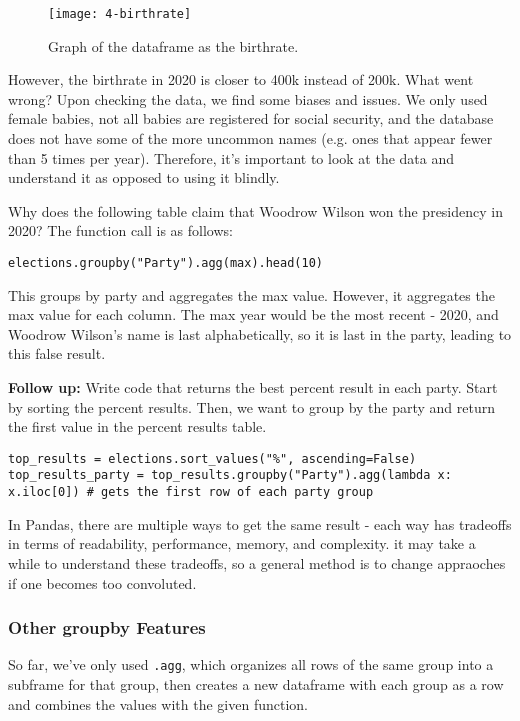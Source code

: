 \begin{figure}[ht]
\texttt{[image: 4-birthrate]}\centering\caption{Graph of the dataframe as the birthrate.}
\end{figure}
However, the birthrate in 2020 is closer to 400k instead of 200k. What went wrong? Upon checking the data, we find some biases and issues. We only used female babies, not all babies are registered for social security, and the database does not have some of the more uncommon names (e.g. ones that appear fewer than 5 times per year). Therefore, it's important to look at the data and understand it as opposed to using it blindly.

\begin{example}[]{Why does the following table claim that Woodrow Wilson won the presidency in 2020? The function call is as follows:
\begin{verbatim}
elections.groupby("Party").agg(max).head(10)
\end{verbatim}
}
\tcbline
This groups by party and aggregates the max value. However, it aggregates the max value for each column. The max year would be the most recent - 2020, and Woodrow Wilson's name is last alphabetically, so it is last in the party, leading to this false result.

\textbf{Follow up:} Write code that returns the best percent result in each party.
\tcbline 
Start by sorting the percent results. Then, we want to group by the party and return the first value in the percent results table.
\begin{verbatim}
top_results = elections.sort_values("%", ascending=False)
top_results_party = top_results.groupby("Party").agg(lambda x: x.iloc[0]) # gets the first row of each party group
\end{verbatim}
\end{example}

\begin{notebox}[]
In Pandas, there are multiple ways to get the same result - each way has tradeoffs in terms of readability, performance, memory, and complexity. it may take a while to understand these tradeoffs, so a general method is to change appraoches if one becomes too convoluted.
\end{notebox}

\subsubsection{Other groupby Features}
So far, we've only used \texttt{.agg}, which organizes all rows of the same group into a subframe for that group, then creates a new dataframe with each group as a row and combines the values with the given function.

